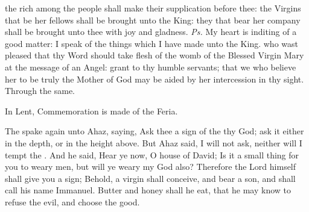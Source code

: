 \introit
{} the rich among the people shall make their supplication before thee: the Virgins that be her fellows shall be brought unto the King: they that bear her company shall be brought unto thee with joy and gladness. \textit{Ps.} My heart is inditing of a good matter: I speak of the things which I have made unto the King.
\collect
 who wast pleased that thy Word should take flesh of the womb of the Blessed Virgin Mary at the message of an Angel: grant to thy humble servants; that we who believe her to be truly the Mother of God may be aided by her intercession in thy sight. Through the same.
\begin{rubric}
    In Lent, Commemoration is made of the Feria.%
\end{rubric}
 The  spake again unto Ahaz, saying, Ask thee a sign of the  thy God; ask it either in the depth, or in the height above. But Ahaz said, I will not ask, neither will I tempt the . And he said, Hear ye now, O house of David; Is it a small thing for you to weary men, but will ye weary my God also? Therefore the Lord himself shall give you a sign; Behold, a virgin shall conceive, and bear a son, and shall call his name Immanuel. Butter and honey shall he eat, that he may know to refuse the evil, and choose the good.
